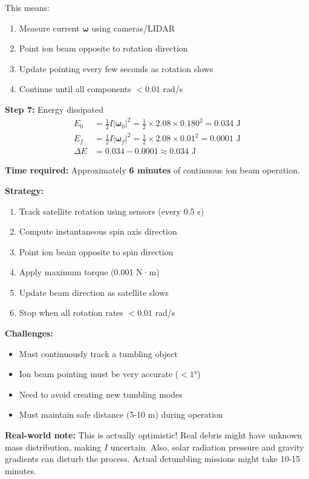 \documentclass[11pt,a4paper]{article}
\begin{document}
This means:
\begin{enumerate}
    \item Measure current $\boldsymbol{\omega}$ using cameras/LIDAR
    \item Point ion beam opposite to rotation direction
    \item Update pointing every few seconds as rotation slows
    \item Continue until all components $< 0.01$ rad/s
\end{enumerate}

\textbf{Step 7:} Energy dissipated
\begin{align}
E_0 &= \frac{1}{2}I|\boldsymbol{\omega}_0|^2 = \frac{1}{2} \times 2.08 \times 0.180^2 = 0.034 \text{ J} \\
E_f &= \frac{1}{2}I|\boldsymbol{\omega}_f|^2 = \frac{1}{2} \times 2.08 \times 0.01^2 = 0.0001 \text{ J} \\
\Delta E &= 0.034 - 0.0001 \approx 0.034 \text{ J}
\end{align}

\begin{tcolorbox}[colback=blue!5!white,colframe=blue!60!black,title=Answer]
\textbf{Time required:} Approximately \textbf{6 minutes} of continuous ion beam operation.

\textbf{Strategy:}
\begin{enumerate}[nosep]
    \item Track satellite rotation using sensors (every 0.5 s)
    \item Compute instantaneous spin axis direction
    \item Point ion beam opposite to spin direction
    \item Apply maximum torque (0.001 N·m)
    \item Update beam direction as satellite slows
    \item Stop when all rotation rates $< 0.01$ rad/s
\end{enumerate}

\textbf{Challenges:}
\begin{itemize}[nosep]
    \item Must continuously track a tumbling object
    \item Ion beam pointing must be very accurate ($< 1°$)
    \item Need to avoid creating new tumbling modes
    \item Must maintain safe distance (5-10 m) during operation
\end{itemize}

\textbf{Real-world note:} This is actually optimistic! Real debris might have unknown mass distribution, making $I$ uncertain. Also, solar radiation pressure and gravity gradients can disturb the process. Actual detumbling missions might take 10-15 minutes.
\end{tcolorbox}
\end{document}
